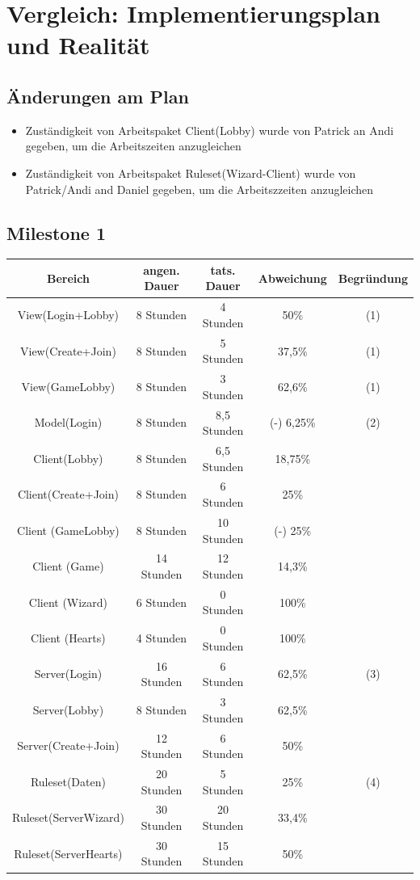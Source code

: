 \documentclass{article}
\begin{document}
\section{Vergleich: Implementierungsplan und Realität}

\subsection{Änderungen am Plan}
\begin{itemize}
\item Zuständigkeit von Arbeitspaket Client(Lobby) wurde von Patrick an Andi gegeben, um die Arbeitszeiten anzugleichen
\item Zuständigkeit von Arbeitspaket Ruleset(Wizard-Client) wurde von Patrick/Andi and Daniel gegeben, um die Arbeitszzeiten anzugleichen
\end{itemize}

\subsection{Milestone 1}

\begin{tabular}{|c|c|c|c|c|}\hline
   Bereich & angen. Dauer & tats. Dauer & Abweichung & Begründung \\ \hline\hline
   View(Login+Lobby) & 8 Stunden & 4 Stunden & 50\% & (1) \\ \hline
   View(Create+Join) & 8 Stunden & 5 Stunden & 37,5\% & (1)\\ \hline
   View(GameLobby) & 8 Stunden & 3 Stunden & 62,6\% & (1)\\ \hline
   Model(Login) & 8 Stunden & 8,5 Stunden & (-) 6,25\% & (2) \\ \hline
   Client(Lobby) & 8 Stunden &  6,5 Stunden & 18,75\% &\\ \hline
   Client(Create+Join) &  8 Stunden & 6 Stunden & 25\% &\\ \hline
   Client (GameLobby) &  8 Stunden & 10 Stunden & (-) 25\% &\\ \hline
   Client (Game) & 14  Stunden &  12 Stunden & 14,3\% &\\ \hline
   Client (Wizard) & 6 Stunden & 0 Stunden & 100\% &\\ \hline
   Client (Hearts) & 4 Stunden & 0 Stunden & 100\% &\\ \hline
   Server(Login) & 16 Stunden & 6 Stunden & 62,5\% & (3) \\ \hline
   Server(Lobby) & 8 Stunden & 3 Stunden & 62,5\% &\\ \hline 
   Server(Create+Join) & 12 Stunden & 6 Stunden & 50\% &\\ \hline 
   Ruleset(Daten) & 20 Stunden & 5 Stunden & 25\% & (4) \\ \hline 
   Ruleset(ServerWizard) & 30 Stunden & 20 Stunden & 33,4\% &\\ \hline 
   Ruleset(ServerHearts) & 30 Stunden & 15 Stunden & 50\% &\\ \hline 
 \end{tabular}
\end{document}
